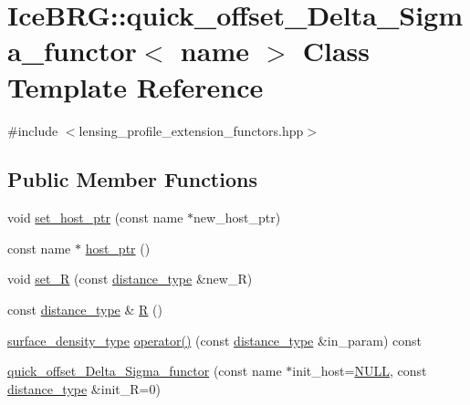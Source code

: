 \hypertarget{classIceBRG_1_1quick__offset__Delta__Sigma__functor}{}\section{Ice\+B\+R\+G\+:\+:quick\+\_\+offset\+\_\+\+Delta\+\_\+\+Sigma\+\_\+functor$<$ name $>$ Class Template Reference}
\label{classIceBRG_1_1quick__offset__Delta__Sigma__functor}


{\ttfamily \#include $<$lensing\+\_\+profile\+\_\+extension\+\_\+functors.\+hpp$>$}

\subsection*{Public Member Functions}
\begin{DoxyCompactItemize}
\item 
void \hyperlink{classIceBRG_1_1quick__offset__Delta__Sigma__functor_a6c97e4d59bd72c17832b61c1e0a0f479}{set\+\_\+host\+\_\+ptr} (const name $\ast$new\+\_\+host\+\_\+ptr)
\item 
const name $\ast$ \hyperlink{classIceBRG_1_1quick__offset__Delta__Sigma__functor_a275512b6a0658f46d991980bbeeff19a}{host\+\_\+ptr} ()
\item 
void \hyperlink{classIceBRG_1_1quick__offset__Delta__Sigma__functor_a51d8eeecf5157f37a62b8af405447761}{set\+\_\+\+R} (const \hyperlink{namespaceIceBRG_a45499647eb87e24c10ab32c628711cec}{distance\+\_\+type} \&new\+\_\+\+R)
\item 
const \hyperlink{namespaceIceBRG_a45499647eb87e24c10ab32c628711cec}{distance\+\_\+type} \& \hyperlink{classIceBRG_1_1quick__offset__Delta__Sigma__functor_a238622d50e2ca51b3677884da90ce6ae}{R} ()
\item 
\hyperlink{namespaceIceBRG_a80c597ef5ba0a32491d32a9f0083b02d}{surface\+\_\+density\+\_\+type} \hyperlink{classIceBRG_1_1quick__offset__Delta__Sigma__functor_a335cbed4b8b11e1a776e9303b7702977}{operator()} (const \hyperlink{namespaceIceBRG_a45499647eb87e24c10ab32c628711cec}{distance\+\_\+type} \&in\+\_\+param) const 
\item 
\hyperlink{classIceBRG_1_1quick__offset__Delta__Sigma__functor_a54ef5555c330fcdeaca4f6e1446f92ac}{quick\+\_\+offset\+\_\+\+Delta\+\_\+\+Sigma\+\_\+functor} (const name $\ast$init\+\_\+host=\hyperlink{lib_2IceBRG__main_2common_8h_a070d2ce7b6bb7e5c05602aa8c308d0c4}{N\+U\+L\+L}, const \hyperlink{namespaceIceBRG_a45499647eb87e24c10ab32c628711cec}{distance\+\_\+type} \&init\+\_\+\+R=0)
\end{DoxyCompactItemize}


